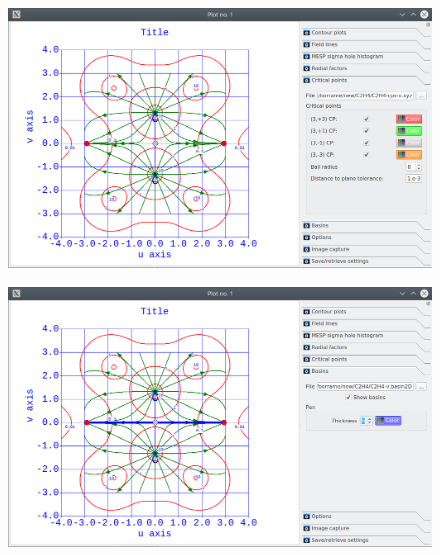\documentclass[a4paper,10pt]{article}
\begin{document}
\begin{minipage}{.5\linewidth}
\begin{figure}[H]
\caption{\label{fig:35}}
\begin{center}
\includegraphics[width=0.95\linewidth]{damqt_QS_fig35.png}
\end{center}
\end{figure} 
\end{minipage}
\begin{minipage}{.5\linewidth}
\begin{figure}[H]
\caption{\label{fig:36}}
\begin{center}
\includegraphics[width=0.95\linewidth]{damqt_QS_fig36.png}
\end{center}
\end{figure} 
\end{minipage}
\end{document}
